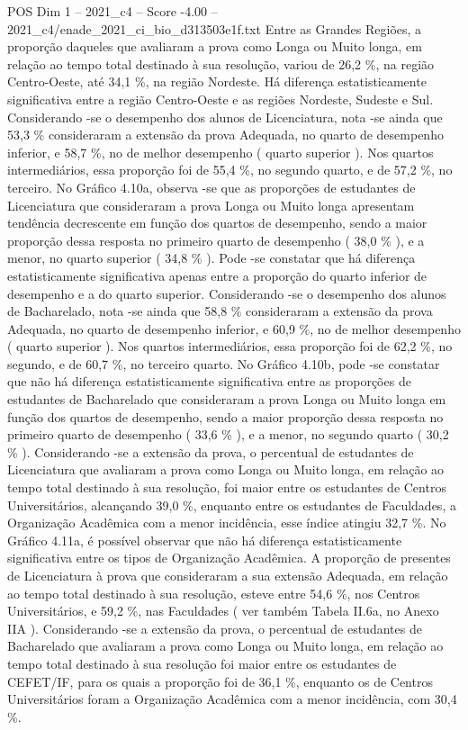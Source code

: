 \begin{textsample}{POS Dim 1 – 2021\_c4 – Score -4.00 – 2021\_c4/enade\_2021\_ci\_bio\_d313503e1f.txt}
Entre as Grandes Regiões, a proporção daqueles que avaliaram a prova como Longa ou Muito longa, em relação ao tempo total destinado à sua resolução, variou de 26,2 \%, na região Centro-Oeste, até 34,1 \%, na região Nordeste.
Há diferença estatisticamente significativa entre a região Centro-Oeste e as regiões Nordeste, Sudeste e Sul.
Considerando -se o desempenho dos alunos de Licenciatura, nota -se ainda que 53,3 \% consideraram a extensão da prova Adequada, no quarto de desempenho inferior, e 58,7 \%, no de melhor desempenho ( quarto superior ).
Nos quartos intermediários, essa proporção foi de 55,4 \%, no segundo quarto, e de 57,2 \%, no terceiro.
No Gráfico 4.10a, observa -se que as proporções de estudantes de Licenciatura que consideraram a prova Longa ou Muito longa apresentam tendência decrescente em função dos quartos de desempenho, sendo a maior proporção dessa resposta no primeiro quarto de desempenho ( 38,0 \% ), e a menor, no quarto superior ( 34,8 \% ).
Pode -se constatar que há diferença estatisticamente significativa apenas entre a proporção do quarto inferior de desempenho e a do quarto superior.
Considerando -se o desempenho dos alunos de Bacharelado, nota -se ainda que 58,8 \% consideraram a extensão da prova Adequada, no quarto de desempenho inferior, e 60,9 \%, no de melhor desempenho ( quarto superior ).
Nos quartos intermediários, essa proporção foi de 62,2 \%, no segundo, e de 60,7 \%, no terceiro quarto.
No Gráfico 4.10b, pode -se constatar que não há diferença estatisticamente significativa entre as proporções de estudantes de Bacharelado que consideraram a prova Longa ou Muito longa em função dos quartos de desempenho, sendo a maior proporção dessa resposta no primeiro quarto de desempenho ( 33,6 \% ), e a menor, no segundo quarto ( 30,2 \% ).
Considerando -se a extensão da prova, o percentual de estudantes de Licenciatura que avaliaram a prova como Longa ou Muito longa, em relação ao tempo total destinado à sua resolução, foi maior entre os estudantes de Centros Universitários, alcançando 39,0 \%, enquanto entre os estudantes de Faculdades, a Organização Acadêmica com a menor incidência, esse índice atingiu 32,7 \%.
No Gráfico 4.11a, é possível observar que não há diferença estatisticamente significativa entre os tipos de Organização Acadêmica.
A proporção de presentes de Licenciatura à prova que consideraram a sua extensão Adequada, em relação ao tempo total destinado à sua resolução, esteve entre 54,6 \%, nos Centros Universitários, e 59,2 \%, nas Faculdades ( ver também Tabela II.6a, no Anexo IIA ).
Considerando -se a extensão da prova, o percentual de estudantes de Bacharelado que avaliaram a prova como Longa ou Muito longa, em relação ao tempo total destinado à sua resolução foi maior entre os estudantes de CEFET/IF, para os quais a proporção foi de 36,1 \%, enquanto os de Centros Universitários foram a Organização Acadêmica com a menor incidência, com 30,4 \%.

\end{textsample}
